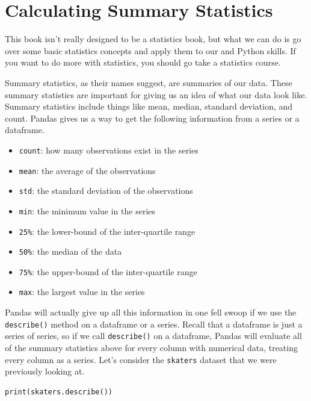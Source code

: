 \section{Calculating Summary Statistics}
This book isn't really designed to be a statistics book, but what we can do is go over some basic statistics concepts and apply them to our  and Python skills. If you want to do more with statistics, you should go take a statistics course.\par
{}
Summary statistics, as their names suggest, are summaries of our data. These summary statistics are important for giving us an idea of what our data look like. Summary statistics include things like mean, median, standard deviation, and count. Pandas gives us a way to get the following information from a series or a dataframe.
\begin{itemize}
	\item \verb|count|: how many observations exist in the series
	\item \verb|mean|: the average of the observations
	\item \verb|std|: the standard deviation of the observations
	\item \verb|min|: the minimum value in the series
	\item \verb|25%|: the lower-bound of the inter-quartile range
	\item \verb|50%|: the median of the data
	\item \verb|75%|: the upper-bound of the inter-quartile range
	\item \verb|max|: the largest value in the series
\end{itemize}
Pandas will actually give up all this information in one fell swoop if we use the \verb|describe()| method on a dataframe or a series. Recall that a dataframe is just a series of series, so if we call \verb|describe()| on a dataframe, Pandas will evaluate all of the summary statistics above for every column with numerical data, treating every column as a series. Let's consider the \verb|skaters| dataset that we were previously looking at.
\begin{lstlisting}[style=pippython]
print(skaters.describe())
\end{lstlisting}
